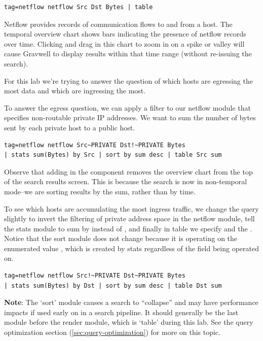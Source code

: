 \begin{Verbatim}[breaklines=true]
tag=netflow netflow Src Dst Bytes | table
\end{Verbatim}

Netflow provides records of communication flows to and from a host. The
temporal overview chart shows bars indicating the presence of netflow
records over time. Clicking and drag in this chart to zoom in on a spike or
valley will cause Gravwell to display results within that time
range (without re-issuing the search).

For this lab we're trying to answer the question of which hosts are
egressing the most data and which are ingressing the most.

To answer the egress question, we can apply a filter to our netflow
module that specifies non-routable private IP addresses. We want to sum
the number of bytes sent by each private host to a public host.

\begin{Verbatim}[breaklines=true]
tag=netflow netflow Src~PRIVATE Dst!~PRIVATE Bytes
| stats sum(Bytes) by Src | sort by sum desc | table Src sum
\end{Verbatim}

Observe that adding in the  component removes the
overview chart from the top of the search results screen. This is
because the search is now in non-temporal mode--we are sorting results by
the sum, rather than by time.

To see which hosts are accumulating the most ingress traffic, we change
the query slightly to invert the filtering of private address space in
the netflow module, tell the stats module to sum by  instead of ,
and finally in table we specify  and the . Notice that the sort
module does not change because it is operating on the enumerated value
, which is created by stats regardless of the field being operated
on.

\begin{Verbatim}[breaklines=true]
tag=netflow netflow Src!~PRIVATE Dst~PRIVATE Bytes
| stats sum(Bytes) by Dst | sort by sum desc | table Dst sum
\end{Verbatim}

\textbf{Note}: The `sort' module causes a search to ``collapse'' and may have
performance impacts if used early on in a search pipeline. It should
generally be the last module before the render module, which is `table'
during this lab. See the query optimization section (\ref{sec:query-optimization}) for more on this topic.



